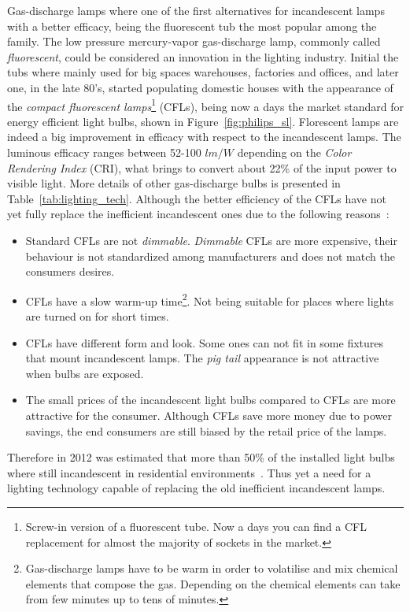 Gas-discharge lamps where one of the first alternatives for incandescent lamps with a better efficacy, being the fluorescent tub the most popular among the family. The low pressure mercury-vapor gas-discharge  lamp, commonly called \emph{fluorescent}, could be considered an innovation in the lighting industry. Initial the tubs where mainly used for big spaces warehouses, factories and offices, and later one, in the late 80's, started populating domestic houses with the appearance of the \emph{compact fluorescent lamps}\footnote{Screw-in version of a fluorescent tube. Now a days you can find a CFL replacement for almost the majority of sockets in the market.} (CFLs), being now a days the market standard for energy efficient light bulbs, shown in Figure~\ref{fig:philips_sl}. Florescent lamps are indeed a big improvement in efficacy with respect to the incandescent lamps. The luminous efficacy ranges between 52-100 $lm/W$ depending on the \emph{Color Rendering Index} (CRI), what brings to convert about 22\% of the input power to visible light. More details of other gas-discharge bulbs is presented in Table~\ref{tab:lighting_tech}. Although the better efficiency of the CFLs have not yet fully replace the inefficient incandescent ones due to the following reasons~\cite{11EPA}:


\begin{itemize}
  \item Standard CFLs are not \emph{dimmable}.  \emph{Dimmable} CFLs are more expensive, their behaviour is not standardized among manufacturers and does not match the consumers desires.
  \item CFLs have a slow warm-up time\footnote{Gas-discharge lamps have to be warm in order to volatilise and mix chemical elements that compose the gas. Depending on the chemical elements can take from few minutes up to tens of minutes. }. Not being suitable for places where lights are turned on for short times.
  \item CFLs have different form and look. Some ones can not fit in some fixtures that mount incandescent lamps. The \emph{pig tail} appearance is not attractive when bulbs are exposed.
  \item The small prices of the incandescent light bulbs compared to CFLs are more attractive for the consumer. Although CFLs save more money due to power savings, the end consumers are still biased by the retail price of the lamps.
\end{itemize}
Therefore in 2012 was estimated that more than 50\% of the installed light bulbs where still incandescent in residential environments~\cite{13ALED}. Thus yet a need for a lighting technology capable of replacing the old inefficient incandescent lamps.

